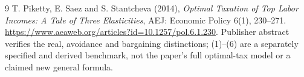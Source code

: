 \documentclass[11pt]{article}
\theoremstyle{definition}
\begin{document}
\begin{thebibliography}{9}
 T. Piketty, E. Saez and S. Stantcheva (2014),
\emph{Optimal Taxation of Top Labor Incomes: A Tale of Three Elasticities},
AEJ: Economic Policy 6(1), 230--271.
\url{https://www.aeaweb.org/articles?id=10.1257/pol.6.1.230}.
Publisher abstract verifies the real, avoidance and bargaining distinctions;
(1)--(6) are a separately specified and derived benchmark, not the paper's
full optimal-tax model or a claimed new general formula.
\end{thebibliography}
\end{document}
